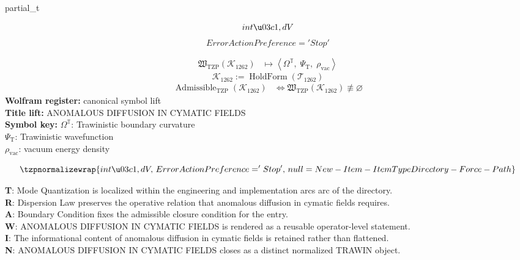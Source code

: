 
\begin{tzpsnapshot}
\end{tzpsnapshot}

partial\_t

\[
int \u03c1,dV
\]
\[
ErrorActionPreference = 'Stop'
\]

\noindent
\begin{minipage}[t]{0.48\linewidth}
\begingroup
\small
\[
\begin{aligned}
\mathfrak{W}_{\mathrm{TZP}}\!\left(\mathcal{K}_{1262}\right)
&\longmapsto
\left\langle \Omega^{\mathbb{T}},\; \Psi_{\mathrm{T}},\; \rho_{\mathrm{vac}} \right\rangle
\end{aligned}
\]
\[
\mathcal{K}_{1262}
:=
\operatorname{HoldForm}\!\left(\mathcal{T}_{1262}\right)
\]
\[
\begin{aligned}
\operatorname{Admissible}_{\mathrm{TZP}}\!\left(\mathcal{K}_{1262}\right)
&\Longleftrightarrow
\mathfrak{W}_{\mathrm{TZP}}\!\left(\mathcal{K}_{1262}\right)\not\equiv\varnothing
\end{aligned}
\]
\textbf{Wolfram register:} canonical symbol lift\\
\textbf{Title lift:} ANOMALOUS DIFFUSION IN CYMATIC FIELDS\\
\textbf{Symbol key:} \(\Omega^{\mathbb{T}}\): Trawinistic boundary curvature\\ \(\Psi_{\mathrm{T}}\): Trawinistic wavefunction\\ \(\rho_{\mathrm{vac}}\): vacuum energy density
\par
\endgroup
\end{minipage}\hfill
\begin{minipage}[t]{0.48\linewidth}
\[
\tzpnormalizewrap{int \u03c1,dV,\,ErrorActionPreference = 'Stop',\,null = New-Item -ItemType Directory -Force -Path}
\]

\small
\textbf{T}: Mode Quantization is localized within the engineering and implementation arcs arc of the directory.\\
\textbf{R}: Dispersion Law preserves the operative relation that anomalous diffusion in cymatic fields requires.\\
\textbf{A}: Boundary Condition fixes the admissible closure condition for the entry.\\
\textbf{W}: ANOMALOUS DIFFUSION IN CYMATIC FIELDS is rendered as a reusable operator-level statement.\\
\textbf{I}: The informational content of anomalous diffusion in cymatic fields is retained rather than flattened.\\
\textbf{N}: ANOMALOUS DIFFUSION IN CYMATIC FIELDS closes as a distinct normalized TRAWIN object.
\normalsize
\end{minipage}

